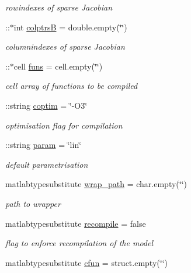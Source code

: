 \begin{DoxyCompactItemize}
\begin{DoxyCompactList}\small\item\em rowindexes of sparse Jacobian \end{DoxyCompactList}\item 
\+::$\ast$int \hyperlink{classamimodel_a3a4891c5565b544dd7d4362dbbfaadf7}{colptrs\+B} = double.\+empty(\char`\"{}\char`\"{})
\begin{DoxyCompactList}\small\item\em columnindexes of sparse Jacobian \end{DoxyCompactList}\item 
\+::$\ast$cell \hyperlink{classamimodel_af80b2560853c3df2b09fef2a198cf5b8}{funs} = cell.\+empty(\char`\"{}\char`\"{})
\begin{DoxyCompactList}\small\item\em cell array of functions to be compiled \end{DoxyCompactList}\item 
\+::string \hyperlink{classamimodel_ad99abcd270ac97546c46292ebc6c2e0a}{coptim} = \char`\"{}-\/O3\char`\"{}
\begin{DoxyCompactList}\small\item\em optimisation flag for compilation \end{DoxyCompactList}\item 
\+::string \hyperlink{classamimodel_a51f20d6b1b54a2eee3be0e8adc96a0ae}{param} = \char`\"{}lin\char`\"{}
\begin{DoxyCompactList}\small\item\em default parametrisation \end{DoxyCompactList}\item 
matlabtypesubstitute \hyperlink{classamimodel_a0b316a20054ba282555674d939a82406}{wrap\+\_\+path} = char.\+empty(\char`\"{}\char`\"{})
\begin{DoxyCompactList}\small\item\em path to wrapper \end{DoxyCompactList}\item 
matlabtypesubstitute \hyperlink{classamimodel_a8d2e824e03e32034b634a7c48f2a26c6}{recompile} = false
\begin{DoxyCompactList}\small\item\em flag to enforce recompilation of the model \end{DoxyCompactList}\item 
matlabtypesubstitute \hyperlink{classamimodel_afec809c626a350367485aa6aaea6b585}{cfun} = struct.\+empty(\char`\"{}\char`\"{})

\end{DoxyCompactItemize}
